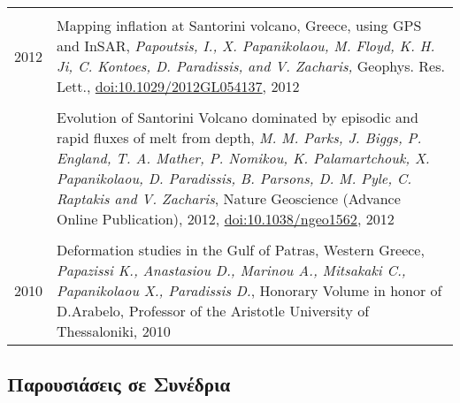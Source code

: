 \documentclass[a4paper,10pt]{article} %
\begin{document}
\begin{longtable}{r|p{14cm}}
\multicolumn{2}{c}{} \\ 
  \textsc{2012}
  & Mapping inflation at Santorini volcano, Greece, using GPS and InSAR,
  \emph{Papoutsis, I., X. Papanikolaou, M. Floyd, K. H. Ji, C. Kontoes, D. Paradissis, and V. Zacharis,}
  Geophys. Res. Lett., \href{http://www.agu.org/pubs/crossref/pip/2012GL054137.shtml}{doi:10.1029/2012GL054137}, 2012\\

  &\\

  & Evolution of Santorini Volcano dominated by episodic and rapid fluxes of melt from depth,
  \emph{M. M. Parks, J. Biggs, P. England, T. A. Mather, P. Nomikou, K. Palamartchouk, X. Papanikolaou, D. Paradissis, B. Parsons, D. M. Pyle, C. Raptakis and V. Zacharis},
  Nature Geoscience (Advance Online Publication), 2012, \href{http://www.nature.com/ngeo/journal/v5/n10/full/ngeo1562.html}{doi:10.1038/ngeo1562}, 2012\\

\multicolumn{2}{c}{} \\ 
  \textsc{2010}
  & Deformation studies in the Gulf of Patras, Western Greece,
  \emph{Papazissi K., Anastasiou D., Marinou A., Mitsakaki C., Papanikolaou X., Paradissis D.}, 
  Honorary Volume in honor of D.Arabelo, Professor of the Aristotle University of Thessaloniki, 2010\\
\end{longtable}

\subsection*{Παρουσιάσεις σε Συνέδρια}
\end{document}
